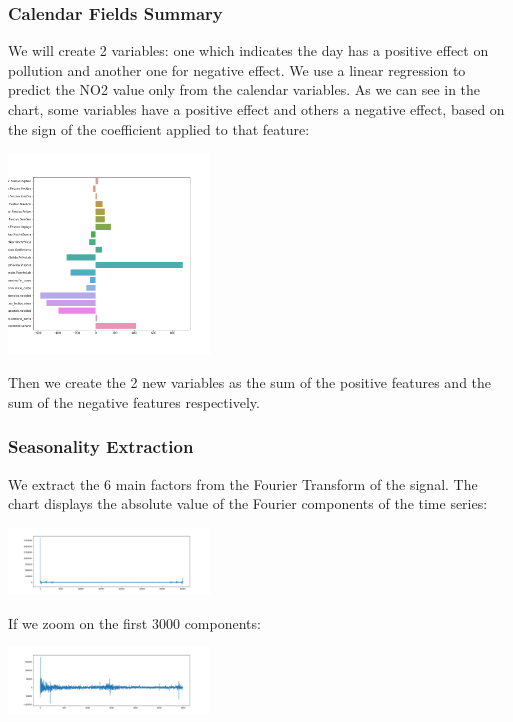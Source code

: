 \documentclass[a4paper,twocolumn,5p]{elsarticle}
\begin{document}
\subsubsection{Calendar Fields Summary}

We will create 2 variables: one which indicates the day has a positive effect on pollution and 
another one for negative effect. We use a linear regression to predict the NO2 value only from the calendar variables.
As we can see in the chart, some variables have a positive effect and others a negative effect, based on the
sign of the coefficient applied to that feature:

\includegraphics[width=0.4\textwidth]{calweights}

Then we create the 2 new variables as the sum of the positive features and the sum of the negative features respectively.

\subsubsection{Seasonality Extraction}

We extract the 6 main factors from the Fourier Transform of the signal. The chart displays the absolute value of
the Fourier components of the time series:

\includegraphics[width=0.4\textwidth]{decomposition}

If we zoom on the first 3000 components:

\includegraphics[width=0.4\textwidth]{decompositionzoom}
\end{document}
